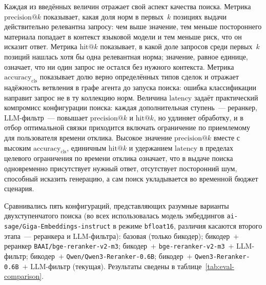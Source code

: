 Каждая из введённых величин отражает свой аспект качества поиска. Метрика $\mathrm{precision}@k$ показывает, какая доля норм в первых~$k$ позициях выдачи действительно релевантна запросу: чем выше значение, тем меньше постороннего материала попадает в контекст языковой модели и тем меньше риск, что он исказит ответ. Метрика $\mathrm{hit}@k$ показывает, в какой доле запросов среди первых~$k$ позиций нашлась хотя бы одна релевантная норма; значение, равное единице, означает, что ни один запрос не остался без нужного контекста. Метрика $\mathrm{accuracy}_{\mathrm{cls}}$ показывает долю верно определённых типов сделок и отражает надёжность ветвления в графе агента до запуска поиска: ошибка классификации направит запрос не в ту коллекцию норм. Величина $\mathrm{latency}$ задаёт практический компромисс конфигурации поиска: каждая дополнительная ступень~--- реранкер, LLM-фильтр~--- повышает $\mathrm{precision}@k$ и $\mathrm{hit}@k$, но удлиняет обработку, и в отбор оптимальной связки приходится включать ограничение по приемлемому для пользователя времени отклика. Высокое значение $\mathrm{precision}@k$ вместе с высоким $\mathrm{accuracy}_{\mathrm{cls}}$, единичным $\mathrm{hit}@k$ и удержанием $\mathrm{latency}$ в пределах целевого ограничения по времени отклика означает, что в выдаче поиска одновременно присутствует нужный ответ, отсутствует посторонний шум, способный исказить генерацию, а сам поиск укладывается во временной бюджет сценария.

Сравнивались пять конфигураций, представляющих разумные варианты двухступенчатого поиска (во всех использовалась модель эмбеддингов \texttt{ai-sage/Giga-Embeddings-instruct} в режиме \texttt{bfloat16}, различия касаются второго этапа~--- реранкера и LLM-фильтра): базовая (только бикодер); бикодер~$+$ реранкер \texttt{BAAI/bge-reranker-v2-m3}; бикодер~$+$ \texttt{bge-reranker-v2-m3}~$+$ LLM-фильтр; бикодер~$+$ \texttt{Qwen/Qwen3-Reranker-0.6B}; бикодер~$+$ \texttt{Qwen3-Reranker-0.6B}~$+$ LLM-фильтр (текущая). Результаты сведены в таблице~\ref{tab:eval-comparison}.

